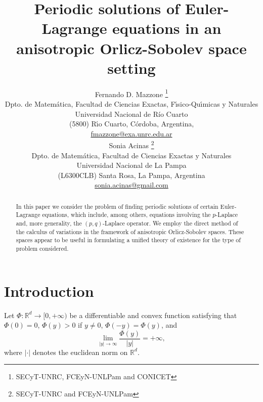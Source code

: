 \documentclass[twoside]{article}
\title{Periodic solutions of
Euler-Lagrange equations in an anisotropic Orlicz-Sobolev space setting  }
\author{
 Fernando D. Mazzone \thanks{SECyT-UNRC, FCEyN-UNLPam and CONICET}\\
Dpto. de Matem\'atica, Facultad de Ciencias Exactas, F\'{\i}sico-Qu\'{\i}micas y Naturales\\
Universidad Nacional de R\'{i}o Cuarto\\
(5800) R\'{\i}o Cuarto, C\'ordoba, Argentina,\\
\url{fmazzone@exa.unrc.edu.ar} \\
Sonia Acinas \thanks{SECyT-UNRC and  FCEyN-UNLPam}\\
Dpto. de Matem\'atica, Facultad de Ciencias Exactas y Naturales\\
Universidad Nacional de La Pampa\\
(L6300CLB) Santa Rosa, La Pampa, Argentina\\
\url{sonia.acinas@gmail.com}\\[3mm]
}
\date{}
\theoremstyle{remark}
\newcommand{\rr}{\mathbb{R}}
\begin{document}
\maketitle
%
\begingroup%
    \renewcommand{\thefootnote}{}%
    \endgroup
%
%
%
%

\begin{abstract}
In this paper we consider the problem of finding periodic solutions of certain Euler-Lagrange equations, which include, among others, equations involving the $p$-Laplace and, more generality, the $(p,q)$-Laplace operator. We employ the direct method of the calculus of variations in the framework of anisotropic Orlicz-Sobolev spaces. These spaces appear to be useful in formulating a unified theory of existence for the type of problem considered.
\end{abstract}






\pagestyle{fancy} \headheight 35pt \fancyhead{} \fancyfoot{}

\fancyfoot[C]{\thepage}  \fancyhead[CO]{\nouppercase{\section}}

\fancyhead[CO]{\nouppercase{\leftmark}}






\section{Introduction}

Let $\Phi:\mathbb{R}^d\to [0,+\infty)$ be  a differentiable and convex function satisfying that $\Phi(0)=0$, $\Phi(y)>0$ if $y\neq 0$, $\Phi(-y)=\Phi(y)$,
 and
\begin{equation}\label{eq:N-sub-inf}
\lim_{|y|\to\infty}\frac{\Phi(y)}{|y|}=+\infty,
\end{equation}
where $|\cdot|$ denotes the euclidean norm on $\rr^d$.
\end{document}
